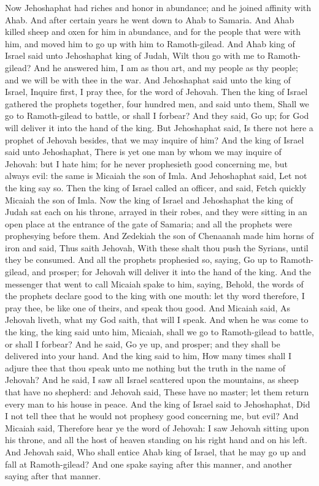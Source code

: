 Now Jehoshaphat had riches and honor in abundance; and he joined affinity with Ahab. And after certain years he went down to Ahab to Samaria. And Ahab killed sheep and oxen for him in abundance, and for the people that were with him, and moved him to go up with him to Ramoth-gilead. And Ahab king of Israel said unto Jehoshaphat king of Judah, Wilt thou go with me to Ramoth-gilead? And he answered him, I am as thou art, and my people as thy people; and we will be with thee in the war.  And Jehoshaphat said unto the king of Israel, Inquire first, I pray thee, for the word of Jehovah. Then the king of Israel gathered the prophets together, four hundred men, and said unto them, Shall we go to Ramoth-gilead to battle, or shall I forbear? And they said, Go up; for God will deliver it into the hand of the king. But Jehoshaphat said, Is there not here a prophet of Jehovah besides, that we may inquire of him? And the king of Israel said unto Jehoshaphat, There is yet one man by whom we may inquire of Jehovah: but I hate him; for he never prophesieth good concerning me, but always evil: the same is Micaiah the son of Imla. And Jehoshaphat said, Let not the king say so. Then the king of Israel called an officer, and said, Fetch quickly Micaiah the son of Imla. Now the king of Israel and Jehoshaphat the king of Judah sat each on his throne, arrayed in their robes, and they were sitting in an open place at the entrance of the gate of Samaria; and all the prophets were prophesying before them. And Zedekiah the son of Chenaanah made him horns of iron and said, Thus saith Jehovah, With these shalt thou push the Syrians, until they be consumed. And all the prophets prophesied so, saying, Go up to Ramoth-gilead, and prosper; for Jehovah will deliver it into the hand of the king.  And the messenger that went to call Micaiah spake to him, saying, Behold, the words of the prophets declare good to the king with one mouth: let thy word therefore, I pray thee, be like one of theirs, and speak thou good. And Micaiah said, As Jehovah liveth, what my God saith, that will I speak. And when he was come to the king, the king said unto him, Micaiah, shall we go to Ramoth-gilead to battle, or shall I forbear? And he said, Go ye up, and prosper; and they shall be delivered into your hand. And the king said to him, How many times shall I adjure thee that thou speak unto me nothing but the truth in the name of Jehovah? And he said, I saw all Israel scattered upon the mountains, as sheep that have no shepherd: and Jehovah said, These have no master; let them return every man to his house in peace. And the king of Israel said to Jehoshaphat, Did I not tell thee that he would not prophesy good concerning me, but evil? And Micaiah said, Therefore hear ye the word of Jehovah: I saw Jehovah sitting upon his throne, and all the host of heaven standing on his right hand and on his left. And Jehovah said, Who shall entice Ahab king of Israel, that he may go up and fall at Ramoth-gilead? And one spake saying after this manner, and another saying after that manner. 